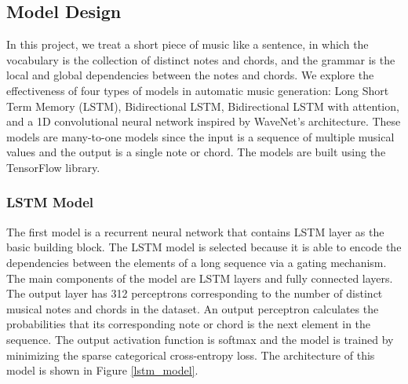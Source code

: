 \documentclass[sigconf,authorversion]{acmart}
\begin{document}
\subsection{Model Design}

In this project, we treat a short piece of music like 
a sentence, in which the vocabulary is the collection of distinct notes 
and chords, and the grammar is the local and global dependencies between
the notes and chords. We explore the effectiveness of four types of models 
in automatic music generation: Long Short Term Memory (LSTM), Bidirectional
LSTM, Bidirectional LSTM with attention, and a 1D convolutional neural 
network inspired by WaveNet's architecture. These models are many-to-one
models since the input is a sequence of multiple musical values and the output 
is a single note or chord. The models are built using the TensorFlow library.

\subsubsection{LSTM Model}

The first model is a recurrent neural network that contains LSTM layer as 
the basic building block. The LSTM model is selected because it is able to encode
the dependencies between the elements of a long sequence via a gating
mechanism. The main components of the model are LSTM layers and fully connected
layers. The output layer has 312 perceptrons corresponding to the number
of distinct musical notes and chords in the dataset. An output perceptron 
calculates the probabilities that its corresponding note or chord is the next
element in the sequence. The output activation function is softmax and the
model is trained by minimizing the sparse categorical cross-entropy loss.
The architecture of this model is shown in Figure \ref{lstm_model}.
\end{document}
